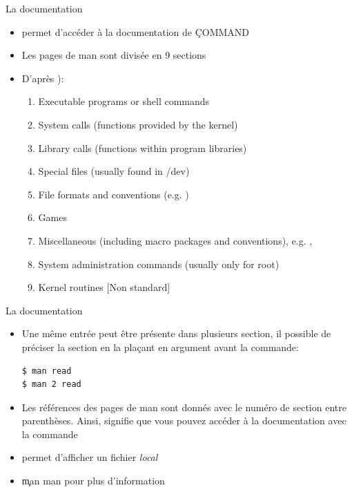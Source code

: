 

\begin{frame}[fragile=singleslide]{La documentation}
  \begin{itemize}
  \item  {} permet  d'accéder  à  la documentation  de
    \c{COMMAND}
  \item  Les  pages  de  man  sont  divisée  en  9  sections
  \item D'après ):
    \begin{enumerate}
    \item Executable programs or shell commands
    \item System calls (functions provided by the kernel)
    \item Library calls (functions within program libraries)
    \item Special files (usually found in /dev)
    \item File formats and conventions (e.g. )
    \item Games
    \item  Miscellaneous (including  macro packages  and conventions),
      e.g.  , 
    \item System administration commands (usually only for root)
    \item Kernel routines [Non standard]
    \end{enumerate}
  \end{itemize}
\end{frame}

\begin{frame}[fragile=singleslide]{La documentation}
  \begin{itemize}
  \item Une même entrée peut  être présente dans plusieurs section, il
    possible de préciser la section en la plaçant en argument avant la
    commande:
    \begin{lstlisting}
$ man read
$ man 2 read
    \end{lstlisting}
  \item Les références des pages de  man sont donnés avec le numéro de
    section entre parenthèses.  Ainsi,  signifie que vous
    pouvez   accéder    à   la   documentation    avec   la   commande
  \item {}  permet d'afficher un fichier \emph{local}
  \item \c{man man} pour plus d'information
  \end{itemize}
\end{frame}

